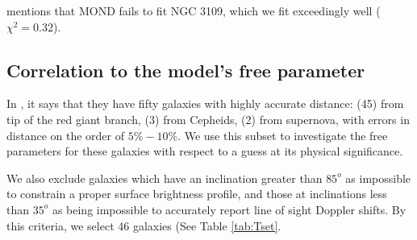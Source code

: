 \documentclass[reprint,%
 amsmath,amssymb,
 aps,
]{revtex4-1}
\begin{document}
\cite{Toky} mentions that MOND fails to fit NGC 3109, which we fit exceedingly well ($\chi^2 = 0.32$).
\subsection{Correlation to  the model's free parameter }


 In \cite{2016Lelli}, it says that they have fifty  galaxies with highly accurate distance: (45) from tip of the red giant branch, (3) from Cepheids, (2) from supernova, with errors in distance on the order of $5\% - 10\%$. We use this subset to investigate   the free parameters for these galaxies with respect to a guess at its physical significance. 
 
 
We also exclude galaxies  which have an inclination greater than $85^o$ as impossible to constrain a proper surface brightness profile, and those at inclinations less than $35^o$ as being impossible to accurately report line of sight Doppler shifts.   
  By this criteria, we select 46 galaxies (See Table \ref{tab:Tset}. 
  
\end{document}

